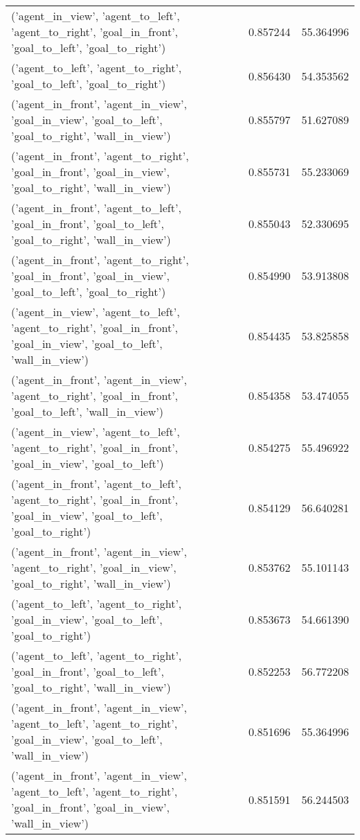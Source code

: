\begin{tabular}{lrr}
('agent\_in\_view', 'agent\_to\_left', 'agent\_to\_right', 'goal\_in\_front', 'goal\_to\_left', 'goal\_to\_right') & 0.857244 & 55.364996 \\
('agent\_to\_left', 'agent\_to\_right', 'goal\_to\_left', 'goal\_to\_right') & 0.856430 & 54.353562 \\
('agent\_in\_front', 'agent\_in\_view', 'goal\_in\_view', 'goal\_to\_left', 'goal\_to\_right', 'wall\_in\_view') & 0.855797 & 51.627089 \\
('agent\_in\_front', 'agent\_to\_right', 'goal\_in\_front', 'goal\_in\_view', 'goal\_to\_right', 'wall\_in\_view') & 0.855731 & 55.233069 \\
('agent\_in\_front', 'agent\_to\_left', 'goal\_in\_front', 'goal\_to\_left', 'goal\_to\_right', 'wall\_in\_view') & 0.855043 & 52.330695 \\
('agent\_in\_front', 'agent\_to\_right', 'goal\_in\_front', 'goal\_in\_view', 'goal\_to\_left', 'goal\_to\_right') & 0.854990 & 53.913808 \\
('agent\_in\_view', 'agent\_to\_left', 'agent\_to\_right', 'goal\_in\_front', 'goal\_in\_view', 'goal\_to\_left', 'wall\_in\_view') & 0.854435 & 53.825858 \\
('agent\_in\_front', 'agent\_in\_view', 'agent\_to\_right', 'goal\_in\_front', 'goal\_to\_left', 'wall\_in\_view') & 0.854358 & 53.474055 \\
('agent\_in\_view', 'agent\_to\_left', 'agent\_to\_right', 'goal\_in\_front', 'goal\_in\_view', 'goal\_to\_left') & 0.854275 & 55.496922 \\
('agent\_in\_front', 'agent\_to\_left', 'agent\_to\_right', 'goal\_in\_front', 'goal\_in\_view', 'goal\_to\_left', 'goal\_to\_right') & 0.854129 & 56.640281 \\
('agent\_in\_front', 'agent\_in\_view', 'agent\_to\_right', 'goal\_in\_view', 'goal\_to\_right', 'wall\_in\_view') & 0.853762 & 55.101143 \\
('agent\_to\_left', 'agent\_to\_right', 'goal\_in\_view', 'goal\_to\_left', 'goal\_to\_right') & 0.853673 & 54.661390 \\
('agent\_to\_left', 'agent\_to\_right', 'goal\_in\_front', 'goal\_to\_left', 'goal\_to\_right', 'wall\_in\_view') & 0.852253 & 56.772208 \\
('agent\_in\_front', 'agent\_in\_view', 'agent\_to\_left', 'agent\_to\_right', 'goal\_in\_view', 'goal\_to\_left', 'wall\_in\_view') & 0.851696 & 55.364996 \\
('agent\_in\_front', 'agent\_in\_view', 'agent\_to\_left', 'agent\_to\_right', 'goal\_in\_front', 'goal\_in\_view', 'wall\_in\_view') & 0.851591 & 56.244503 \\

\end{tabular}
